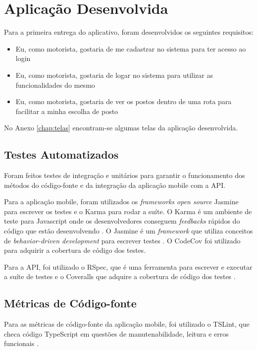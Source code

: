 \section{Aplicação Desenvolvida}
Para a primeira entrega do aplicativo, foram desenvolvidos os seguintes requisitos:
\begin{itemize}
    \item Eu, como motorista, gostaria de me cadastrar no sistema para ter acesso ao login
    \item Eu, como motorista, gostaria de logar no sistema para utilizar as funcionalidades do mesmo
    \item Eu, como motorista, gostaria de ver os postos dentro de uma rota para facilitar a minha escolha de posto
\end{itemize}
No Anexo \ref{chap:telas} encontram-se algumas telas da aplicação desenvolvida.

\subsection{Testes Automatizados}

Foram feitos testes de integração e unitários para garantir o funcionamento dos métodos do código-fonte e da integração da aplicação mobile com a API.

Para a aplicação mobile, foram utilizados os \textit{frameworks open source} Jasmine para escrever os testes e o Karma para rodar a suíte. O Karma é um ambiente de teste para Javascript onde os desenvolvedores conseguem \textit{feedbacks} rápidos do código que estão desenvolvendo \cite{karma}. O Jasmine é um \textit{framework} que utiliza conceitos de \textit{behavior-driven development} para escrever testes \cite{jasmine}. O CodeCov foi utilizado para adquirir a cobertura de código dos testes.

Para a API, foi utilizado o RSpec, que é uma ferramenta para escrever e executar a suíte de testes \cite{rspec} e o Coveralls que adquire a cobertura de código dos testes \cite{coveralls}.

\subsection{Métricas de Código-fonte}

Para as métricas de código-fonte da aplicação mobile, foi utilizado o TSLint, que checa código TypeScript em questões de manutenabilidade, leitura e erros funcionais \cite{tslint}.

